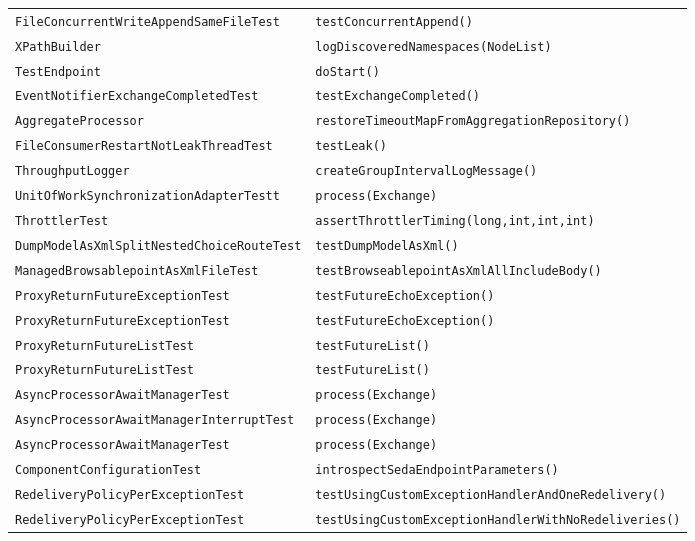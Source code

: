 \begin{center}
\begin{longtable}{ll}
\lstinline/FileConcurrentWriteAppendSameFileTest/&{\lstinline/testConcurrentAppend()/}\\
\lstinline/XPathBuilder/&{\lstinline/logDiscoveredNamespaces(NodeList)/}\\
\lstinline/TestEndpoint/&{\lstinline/doStart()/}\\
\lstinline/EventNotifierExchangeCompletedTest/&{\lstinline/testExchangeCompleted()/}\\
\lstinline/AggregateProcessor/&{\lstinline/restoreTimeoutMapFromAggregationRepository()/}\\
\lstinline/FileConsumerRestartNotLeakThreadTest/&{\lstinline/testLeak()/}\\
\lstinline/ThroughputLogger/&{\lstinline/createGroupIntervalLogMessage()/}\\
\lstinline/UnitOfWorkSynchronizationAdapterTestt/&{\lstinline/process(Exchange)/}\\
\lstinline/ThrottlerTest/&{\lstinline/assertThrottlerTiming(long,int,int,int)/}\\
\lstinline/DumpModelAsXmlSplitNestedChoiceRouteTest/&{\lstinline/testDumpModelAsXml()/}\\
\lstinline/ManagedBrowsablepointAsXmlFileTest/&{\lstinline/testBrowseablepointAsXmlAllIncludeBody()/}\\
\lstinline/ProxyReturnFutureExceptionTest/&{\lstinline/testFutureEchoException()/}\\
\lstinline/ProxyReturnFutureExceptionTest/&{\lstinline/testFutureEchoException()/}\\
\lstinline/ProxyReturnFutureListTest/&{\lstinline/testFutureList()/}\\
\lstinline/ProxyReturnFutureListTest/&{\lstinline/testFutureList()/}\\
\lstinline/AsyncProcessorAwaitManagerTest/&{\lstinline/process(Exchange)/}\\
\lstinline/AsyncProcessorAwaitManagerInterruptTest/&{\lstinline/process(Exchange)/}\\
\lstinline/AsyncProcessorAwaitManagerTest/&{\lstinline/process(Exchange)/}\\
\lstinline/ComponentConfigurationTest/&{\lstinline/introspectSedaEndpointParameters()/}\\
\lstinline/RedeliveryPolicyPerExceptionTest/&{\lstinline/testUsingCustomExceptionHandlerAndOneRedelivery()/}\\
\lstinline/RedeliveryPolicyPerExceptionTest/&{\lstinline/testUsingCustomExceptionHandlerWithNoRedeliveries()/}\\

\end{longtable}
\end{center}
